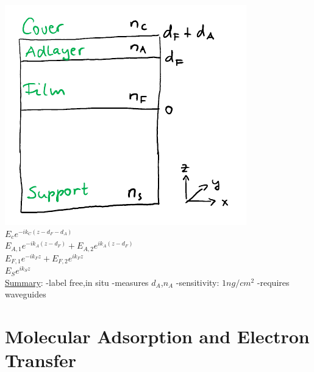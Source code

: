 \documentclass[9pt]{article}
\begin{document}
\begin{multicols}{2}
\includegraphics[scale=0.3]{Images/OWLS2.png}
$E_c e^{-ik_C(z-d_F-d_A)}$\\
$E_{A,1}e^{-ik_A(z-d_F)}{+}E_{A,2}e^{ik_A(z-d_F)}$\\
$E_{F,1}e^{-ik_Fz}{+}E_{F,2}e^{ik_Fz}$\\
$E_Se^{ik_Sz}$\\
\underline{Summary}: 
-label free,in situ 
-measures $d_A$,$n_A$ 
-sensitivity: $1ng/cm^2$ 
-requires waveguides 

\section{Molecular Adsorption and Electron Transfer}

\end{multicols}
\end{document}

